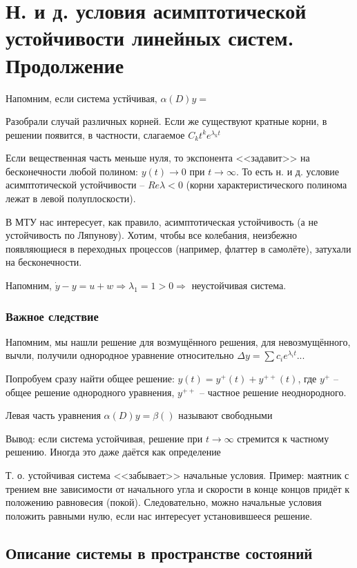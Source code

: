 \documentclass[main.tex]{subfiles}
\begin{document}
	
\section{Н. и д. условия асимптотической устойчивости линейных систем. Продолжение}

Напомним, если система устйчивая, $\alpha(D)y =$ %

Разобрали случай различных корней.
Если же существуют кратные корни, в решении появится, в частности, слагаемое $ C_kt^k e^{\lambda_k t} $

Если вещественная часть меньше нуля, то экспонента <<задавит>> на бесконечности любой полином: $ y(t) \to 0 $ при $ t \to \infty $.
То есть н. и д. условие асимптотической устойчивости -- $ \boxed{Re \lambda < 0} $ (корни характеристического полинома лежат в левой полуплоскости).

В МТУ нас интересует, как правило, асимптотическая устойчивость (а не устойчивость по Ляпунову).
Хотим, чтобы все колебания, неизбежно появляющиеся в  переходных процессов (например, флаттер в самолёте), затухали на бесконечности.

Напомним, $ \dot y - y = u + w \Rightarrow \lambda_1 = 1 > 0 \Rightarrow $ неустойчивая система.

\subsubsection{Важное следствие}

Напомним, мы нашли решение для возмущённого решения, для невозмущённого, вычли, получили однородное уравнение относительно $ \Delta y = \sum c_i e^{\lambda_i t} $...

Попробуем сразу найти общее решение: $ y(t) = y^+(t) + y^{++}(t) $, где $y^+$ -- общее решение однородного уравнения, $y^{++}$ -- частное решение неоднородного.

Левая часть уравнения $ \alpha(D)y = \beta() $ называют свободными %

Вывод: если система устойчивая, решение при $ t \to \infty $ стремится к частному решению.
Иногда это даже даётся как определение

Т. о. устойчивая система <<забывает>> начальные условия.
Пример: маятник с трением вне зависимости от начального угла и скорости в конце концов придёт к положению равновесия (покой).
Следовательно, можно начальные условия положить равными нулю, если нас интересует установившееся решение.

\subsection{Описание системы в пространстве состояний}
\end{document}
